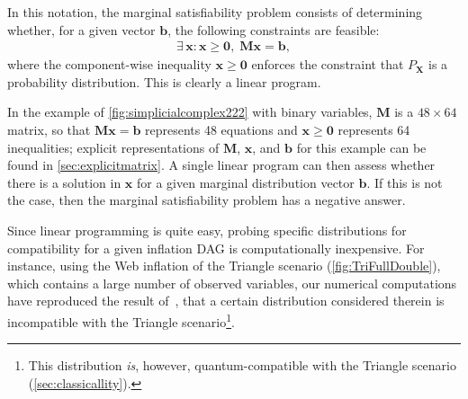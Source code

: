 \documentclass[aps,english,10pt,superscriptaddress,onecolumn,twoside,longbibliography,pra,floatfix,fleqn,nofootinbib]{revtex4-1}%
\theoremstyle{definition}
\newcounter{example}[section]
\begin{document}
In this notation, the marginal satisfiability problem consists of determining whether, for a given vector $\bm{b}$, the following constraints are feasible:
\begin{align}\label{eq:marginalproblemgeneric}
    \exists\, \bm{x} :{\bm{x} \geq \bm{0}} ,\; \bm{M}\bm{x}=\bm{b},
\end{align}
where the component-wise inequality $\bm{x}\geq\bm{0}$ enforces the constraint that $P_{\bm{X}}$ is a probability distribution. 
This is clearly a linear program.

In the example of \cref{fig:simplicialcomplex222} with binary variables, $\bm{M}$ is a $48\times 64$ matrix, so that $\bm{M}\bm{x}=\bm{b}$ represents 48 equations and $\bm{x} \geq \bm{0}$ represents 64 inequalities; explicit representations of  $\bm{M}$, $\bm{x}$, and $\bm{b}$ for this example can be found in \cref{sec:explicitmatrix}.
A single linear program can then assess whether there is a solution in $\bm{x}$ for a given marginal distribution vector $\bm{b}$. If this is not the case, then the marginal satisfiability problem has a negative answer. 

Since linear programming is quite easy, probing specific distributions for compatibility for a given inflation DAG is computationally inexpensive. For instance, using the Web inflation of the Triangle scenario (\cref{fig:TriFullDouble}), which contains a large number of observed variables, our numerical computations have reproduced the result of~\cite[Theorem~2.16]{fritz2012bell}, that a certain distribution considered therein is incompatible with the Triangle scenario\footnote{This distribution {\em is}, however, quantum-compatible with the Triangle scenario (\cref{sec:classicallity}).}.
\end{document}
